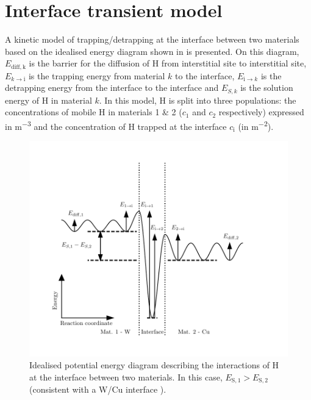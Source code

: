 \chapter{Interface transient model}

A kinetic model of trapping/detrapping at the interface between two materials based on the idealised energy diagram shown in  is presented.
On this diagram, $E_\mathrm{diff,k}$ is the barrier for the diffusion of H from interstitial site to interstitial site, $E_{k\rightarrow \mathrm{i}}$ is the trapping energy from material $k$ to the interface, $E_{\mathrm{i}\rightarrow k}$ is the detrapping energy from the interface to the interface and $E_{S,k}$ is the solution energy of H in material $k$.
In this model, H is split into three populations: the concentrations of mobile H in materials 1 \& 2 ($c_1$ and $c_2$ respectively) expressed in \si{m^{-3}} and the concentration of H trapped at the interface $c_\mathrm{i}$ (in \si{m^{-2}}).
\begin{figure}[ht!]
    \centering
    \includegraphics[width=\linewidth]{Figures/appendix/interface_E.pdf}
    \caption{Idealised potential energy diagram describing the interactions of H at the interface between two materials. In this case, $E_\mathrm{S,1}>E_\mathrm{S,2}$ (consistent with a W/Cu interface ).}
\end{figure}
